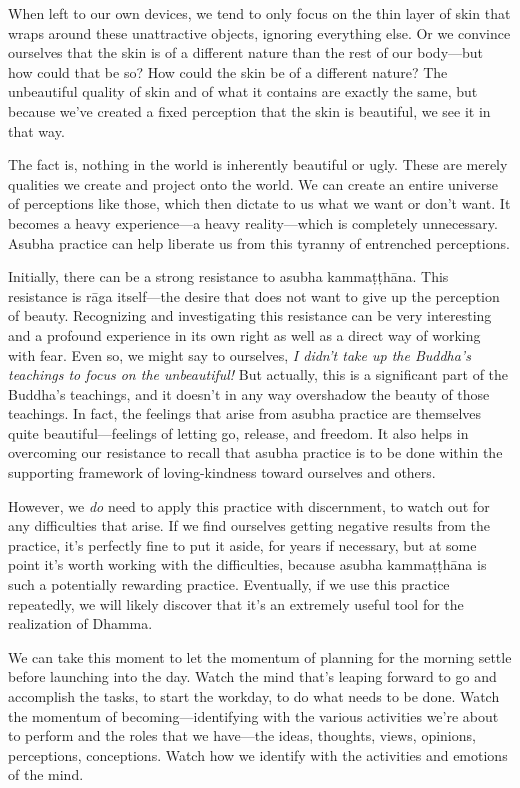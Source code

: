 When left to our own devices, we tend to only focus on the thin layer 
of skin that wraps around these unattractive objects, ignoring 
everything else. Or we convince ourselves that the skin is of a 
different nature than the rest of our body---but how could that be so? 
How could the skin be of a different nature? The unbeautiful quality of 
skin and of what it contains are exactly the same, but because we've 
created a fixed perception that the skin is beautiful, we see it in 
that way.

The fact is, nothing in the world is inherently beautiful or ugly. 
These are merely qualities we create and project onto the world. We can 
create an entire universe of perceptions like those, which then dictate 
to us what we want or don't want. It becomes a heavy experience---a 
heavy reality---which is completely unnecessary. Asubha practice can 
help liberate us from this tyranny of entrenched perceptions.

Initially, there can be a strong resistance to asubha kammaṭṭhāna. 
This resistance is rāga itself---the desire that does not want to give 
up the perception of beauty. Recognizing and investigating this 
resistance can be very interesting and a profound experience in its own 
right as well as a direct way of working with fear. Even so, we might 
say to ourselves, \emph{I didn't take up the Buddha's teachings to 
focus on the unbeautiful!} But actually, this is a significant part of 
the Buddha's teachings, and it doesn't in any way overshadow the beauty 
of those teachings. In fact, the feelings that arise from asubha 
practice are themselves quite beautiful---feelings of letting go, 
release, and freedom. It also helps in overcoming our resistance to 
recall that asubha practice is to be done within the supporting 
framework of loving-kindness toward ourselves and others.

However, we \emph{do} need to apply this practice with discernment, to 
watch out for any difficulties that arise. If we find ourselves getting 
negative results from the practice, it's perfectly fine to put it 
aside, for years if necessary, but at some point it's worth working 
with the difficulties, because asubha kammaṭṭhāna is such a 
potentially rewarding practice. Eventually, if we use this practice 
repeatedly, we will likely discover that it's an extremely useful tool 
for the realization of Dhamma.


We can take this moment to let the momentum of planning for the morning 
settle before launching into the day. Watch the mind that's leaping 
forward to go and accomplish the tasks, to start the workday, to do 
what needs to be done. Watch the momentum of becoming---identifying 
with the various activities we're about to perform and the roles that 
we have---the ideas, thoughts, views, opinions, perceptions, 
conceptions. Watch how we identify with the activities and emotions of 
the mind.

